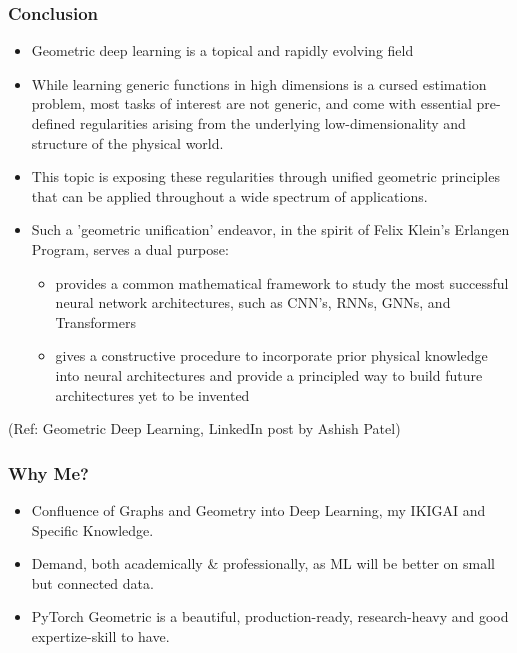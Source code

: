 \begin{frame}[fragile]\frametitle{Conclusion}

\begin{itemize}
\item Geometric deep learning is a topical and rapidly evolving field
\item  While learning generic functions in high dimensions is a cursed estimation problem, most tasks of interest are not generic, and come with essential pre-defined regularities arising from the underlying low-dimensionality and structure of the physical world. 
\item This topic is  exposing these regularities through unified geometric principles that can be applied throughout a wide spectrum of applications.
\item Such a 'geometric unification' endeavor, in the spirit of Felix Klein's Erlangen Program, serves a dual purpose: 
\begin{itemize}
\item  provides a common mathematical framework to study the most successful neural network architectures, such as CNN's, RNNs, GNNs, and Transformers
\item gives a constructive procedure to incorporate prior physical knowledge into neural architectures and provide a principled way to build future architectures yet to be invented
	\end{itemize}
	\end{itemize}

{\tiny (Ref: Geometric Deep Learning, LinkedIn post by Ashish Patel)}

\end{frame}

\begin{frame}[fragile]\frametitle{Why Me?}

\begin{itemize}
\item Confluence of Graphs and Geometry into Deep Learning, my IKIGAI and Specific Knowledge.
\item Demand, both academically \& professionally, as ML will be better on small but connected data.
\item PyTorch Geometric is a beautiful, production-ready, research-heavy and good expertize-skill to have.
\end{itemize}
	  
\end{frame}



